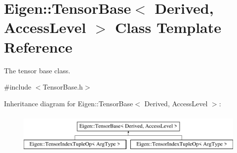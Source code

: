 \hypertarget{class_eigen_1_1_tensor_base}{}\section{Eigen\+:\+:Tensor\+Base$<$ Derived, Access\+Level $>$ Class Template Reference}
\label{class_eigen_1_1_tensor_base}


The tensor base class.  




{\ttfamily \#include $<$Tensor\+Base.\+h$>$}

Inheritance diagram for Eigen\+:\+:Tensor\+Base$<$ Derived, Access\+Level $>$\+:\begin{figure}[H]
\begin{center}
\leavevmode
\includegraphics[height=2.000000cm]{class_eigen_1_1_tensor_base}
\end{center}
\end{figure}

